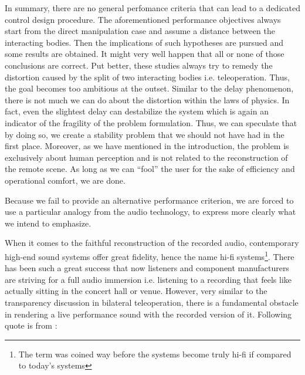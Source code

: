 In summary, there are no general perfomance criteria that can lead to a dedicated control design procedure. The aforementioned 
performance objectives always start from the direct manipulation case and assume a distance between the interacting bodies.
Then the implications of such hypotheses are pursued and some results are obtained. It might very well happen that all or none 
of those conclusions are correct. Put better, these studies always try to remedy the distortion caused by the split of two 
interacting bodies i.e. teleoperation. Thus, the goal becomes too ambitious at the outset. Similar to the delay phenomenon, 
there is not much we can do about the distortion within the laws of physics. In fact, even the slightest delay can destabilize 
the system which is again an indicator of the fragility of the problem formulation. 
Thus, we can speculate that by doing so, we create a stability problem that we should not have had in the first place. Moreover, 
as we have mentioned in the introduction, the problem is exclusively about human perception and is not related to the reconstruction 
of the remote scene. As long as we can \enquote{fool} the user for the sake of efficiency and operational comfort, we are done. 

Because we fail to provide an alternative performance criterion, we are forced to use a particular analogy from the audio
technology, to express more clearly what we intend to emphasize. 

When it comes to the faithful reconstruction of the recorded audio, contemporary high-end sound systems offer great fidelity, hence 
the name hi-fi systems\footnote{The term was coined way before the systems become truly hi-fi if compared to today's systems}. There has 
been such a great success that now listeners and component manufacturers are striving for a full audio immersion i.e. listening to 
a recording that feels like actually sitting in the concert hall or venue. However, very similar to the transparency discussion 
in bilateral teleoperation, there is a fundamental obstacle in rendering a live performance sound with the recorded version of it. 
Following quote is from \cite{atkinson}:

